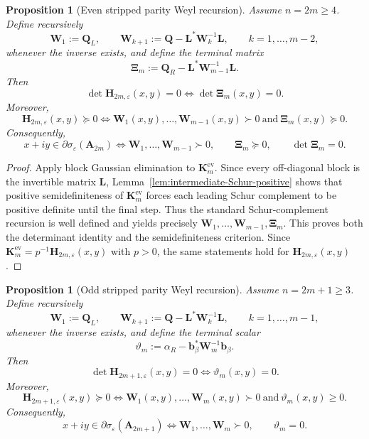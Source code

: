 \documentclass[11pt]{article}
\newtheorem{proposition}[theorem]{Proposition}
\begin{document}
\begin{proposition}[Even stripped parity Weyl recursion]\label{prop:even-stripped-parity-Weyl}
Assume \(n=2m\ge 4\). Define recursively
\[
\mathbf{W}_1:=\mathbf{Q}_L,
\qquad
\mathbf{W}_{k+1}:=\mathbf{Q}-\mathbf{L}^*\mathbf{W}_k^{-1}\mathbf{L},
\qquad k=1,\dots,m-2,
\]
whenever the inverse exists, and define the terminal matrix
\[
\boldsymbol{\Xi}_m:=\mathbf{Q}_R-\mathbf{L}^*\mathbf{W}_{m-1}^{-1}\mathbf{L}.
\]
Then
\[
\det \mathbf{H}_{2m,\varepsilon}(x,y)=0
\iff
\det \boldsymbol{\Xi}_m(x,y)=0.
\]
Moreover,
\[
\mathbf{H}_{2m,\varepsilon}(x,y)\succeq 0
\iff
\mathbf{W}_1(x,y),\dots,\mathbf{W}_{m-1}(x,y)\succ 0
\ \text{and}\
\boldsymbol{\Xi}_m(x,y)\succeq 0.
\]
Consequently,
\[
x+iy\in \partial\sigma_\varepsilon(\mathbf{A}_{2m})
\iff
\mathbf{W}_1,\dots,\mathbf{W}_{m-1}\succ 0,
\qquad
\boldsymbol{\Xi}_m\succeq 0,
\qquad
\det \boldsymbol{\Xi}_m=0.
\]
\end{proposition}

\begin{proof}
Apply block Gaussian elimination to \(\mathbf{K}_m^{\mathrm{ev}}\). Since every off-diagonal block is the invertible matrix \(\mathbf{L}\), Lemma~\ref{lem:intermediate-Schur-positive} shows that positive semidefiniteness of \(\mathbf{K}_m^{\mathrm{ev}}\) forces each leading Schur complement to be positive definite until the final step. Thus the standard Schur-complement recursion is well defined and yields precisely \(\mathbf{W}_1,\dots,\mathbf{W}_{m-1},\boldsymbol{\Xi}_m\). This proves both the determinant identity and the semidefiniteness criterion. Since \(\mathbf{K}_m^{\mathrm{ev}}=p^{-1}\mathbf{H}_{2m,\varepsilon}(x,y)\) with \(p>0\), the same statements hold for \(\mathbf{H}_{2m,\varepsilon}(x,y)\).
\end{proof}

\begin{proposition}[Odd stripped parity Weyl recursion]\label{prop:odd-stripped-parity-Weyl}
Assume \(n=2m+1\ge 3\). Define recursively
\[
\mathbf{W}_1:=\mathbf{Q}_L,
\qquad
\mathbf{W}_{k+1}:=\mathbf{Q}-\mathbf{L}^*\mathbf{W}_k^{-1}\mathbf{L},
\qquad k=1,\dots,m-1,
\]
whenever the inverse exists, and define the terminal scalar
\[
\vartheta_m:=\alpha_R-\mathbf{b}_\beta^*\mathbf{W}_m^{-1}\mathbf{b}_\beta.
\]
Then
\[
\det \mathbf{H}_{2m+1,\varepsilon}(x,y)=0
\iff
\vartheta_m(x,y)=0.
\]
Moreover,
\[
\mathbf{H}_{2m+1,\varepsilon}(x,y)\succeq 0
\iff
\mathbf{W}_1(x,y),\dots,\mathbf{W}_m(x,y)\succ 0
\ \text{and}\
\vartheta_m(x,y)\ge 0.
\]
Consequently,
\[
x+iy\in \partial\sigma_\varepsilon(\mathbf{A}_{2m+1})
\iff
\mathbf{W}_1,\dots,\mathbf{W}_m\succ 0,
\qquad
\vartheta_m=0.
\]
\end{proposition}
\end{document}
